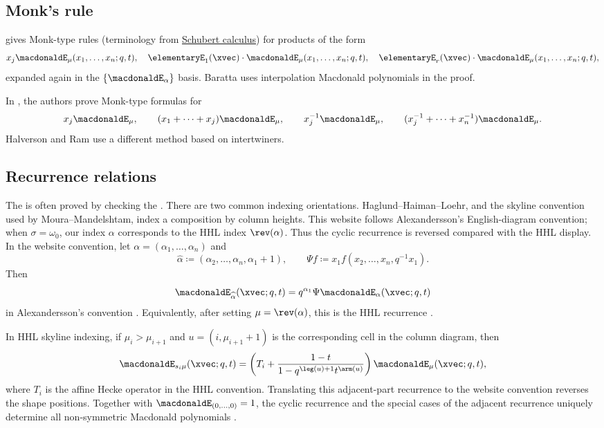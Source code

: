 \subsection[macdonaldEMonks]{Monk's rule}

 \cite{Baratta2009,Baratta2011} gives Monk-type
rules (terminology from \hyperref[schubertMonksRule]{Schubert calculus}) for
products of the form
\[
x_j \macdonaldE_\mu(x_1,\dotsc,x_n;q,t), \quad
\elementaryE_1(\xvec) \cdot \macdonaldE_\mu(x_1,\dotsc,x_n;q,t), \quad
 \elementaryE_{r}(\xvec) \cdot\macdonaldE_\mu(x_1,\dotsc,x_n;q,t),
\]
expanded again in the $\{\macdonaldE_\alpha\}$ basis.
Baratta uses interpolation Macdonald polynomials in the proof.

In \cite{HalversonRam2022x}, the authors prove Monk-type formulas for
\[
x_j \macdonaldE_\mu, \qquad
(x_1+\dotsb+x_j) \macdonaldE_\mu, \qquad
x_j^{-1} \macdonaldE_\mu, \qquad
(x_j^{-1}+\dotsb+x^{-1}_n) \macdonaldE_\mu.
\]
Halverson and Ram use a different method based on intertwiners.

\subsection[macdonaldERecurrences]{Recurrence relations}

The \label{hhlFillingFormula} is often proved by
checking the \label{knopSahiRecurrence}.
There are two common indexing
orientations.  Haglund--Haiman--Loehr, and the skyline convention used by
Moura--Mandelshtam, index a composition by column heights.  This website
follows Alexandersson's English-diagram convention; when $\sigma=\omega_0$,
our index $\alpha$ corresponds to the HHL index $\rev(\alpha)$.
Thus the cyclic recurrence is reversed compared with the HHL display.
In the website convention, let $\alpha=(\alpha_1,\dotsc,\alpha_n)$ and
\[
\widehat{\alpha}\coloneqq(\alpha_2,\dotsc,\alpha_n,\alpha_1+1),\qquad
\Psi f\coloneqq x_1f(x_2,\dotsc,x_n,q^{-1}x_1).
\]
Then
\[
\macdonaldE_{\widehat{\alpha}}(\xvec;q,t)
  = q^{\alpha_1}\Psi\macdonaldE_\alpha(\xvec;q,t)
\]
in Alexandersson's convention \cite[Sec.~3]{Alexandersson2015gbMacdonald}.
Equivalently, after setting $\mu=\rev(\alpha)$, this is the HHL recurrence
\cite[Sec.~2.1]{HaglundHaimanLoehr2008}.

In HHL skyline indexing, if $\mu_i>\mu_{i+1}$ and
$u=(i,\mu_{i+1}+1)$ is the corresponding cell in the column diagram, then
\[
\macdonaldE_{s_i\mu}(\xvec;q,t)
  =
  \left(
    T_i+
    \frac{1-t}{1-q^{\leg(u)+1}t^{\arm(u)}}
  \right)
  \macdonaldE_\mu(\xvec;q,t),
\]
where $T_i$ is the affine Hecke operator in the HHL convention.  Translating
this adjacent-part recurrence to the website convention reverses the shape
positions.  Together with $\macdonaldE_{(0,\dotsc,0)}=1$, the cyclic
recurrence and the special cases of the adjacent recurrence uniquely
determine all non-symmetric Macdonald polynomials
\cite[Sec.~2.1]{HaglundHaimanLoehr2008}.

